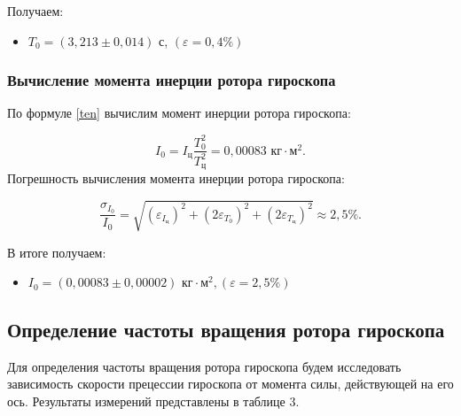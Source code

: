     Получаем:

\begin{itemize}
	\item 
	$ T_0 = \left( 3,213 \pm 0,014 \right) $ с, $ \left( \varepsilon = 0,4 \% \right)  $
\end{itemize}





\subsubsection{Вычисление момента инерции ротора гироскопа}

По формуле \eqref{ten} вычислим момент инерции ротора гироскопа:

\[
I_0=I_\text{ц}\frac{T_0^2}{T_\text{ц}^2} = 0,00083 \text{ кг} \cdot \text{м}^2.
\]
Погрешность вычисления момента инерции ротора гироскопа:

\[
\frac{\sigma_{I_0}}{I_0} = \sqrt{\left( \varepsilon_{I_\text{ц}} \right)^2 +\left( 2 \varepsilon_{T_0} \right)^2 + \left(2 \varepsilon_{T_\text{ц}} \right)^2} \approx  2,5\%.
\]

В итоге получаем: \label{inertion}

\begin{itemize}
	\item $ I_0 = \left( 0,00083 \pm 0,00002 \right) \text{ кг} \cdot \text{м}^2, \left( \varepsilon = 2,5 \% \right) $
\end{itemize}






\subsection{Определение частоты вращения ротора гироскопа}

    Для определения частоты вращения ротора гироскопа будем исследовать зависимость скорости прецессии гироскопа от момента силы, действующей на его ось. Результаты измерений представлены в таблице 3.


